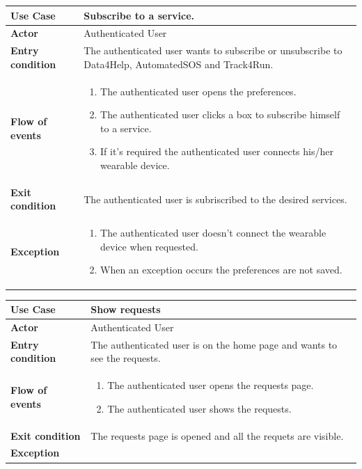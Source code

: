 \documentclass[../main.tex]{subfiles}
\begin{document}
	\vspace*{3cm}
	\begin{center}
		\begin{tabular}{p{3cm}p{8.28cm}}
			\hline
			\textbf{Use Case} & Subscribe to a service.\\
			\hline
			\textbf{Actor} & Authenticated User\\
			\hline
			\textbf{Entry condition} & The authenticated user wants to subscribe or unsubscribe to Data4Help, AutomatedSOS and Track4Run.\\
			\hline
			\textbf{Flow of events} & \begin{enumerate}
				\linespread{0}\item The authenticated user opens the preferences.
				\linespread{0}\item The authenticated user clicks a box to subscribe himself to a service.
				\linespread{0}\item If it's required the authenticated user connects his/her wearable device.
			\end{enumerate}\\
			\hline
			\textbf{Exit condition} & The authenticated user is subriscribed to the desired services.\\
			\hline
			\textbf{Exception} & \begin{enumerate}
				\linespread{0}\item The authenticated user doesn't connect the wearable device when requested.
				\linespread{0}\item When an exception occurs the preferences are not saved.
			\end{enumerate}\\
			\hline
		\end{tabular}
	\end{center}
	\vspace*{3cm}
	\begin{center}
		\begin{tabular}{p{3cm}p{8.28cm}}
			\hline
			\textbf{Use Case} & Show requests\\
			\hline
			\textbf{Actor} & Authenticated User\\
			\hline
			\textbf{Entry condition} & The authenticated user is on the home page and wants to see the requests.\\
			\hline
			\textbf{Flow of events} & \begin{enumerate}
				\linespread{0}\item The authenticated user opens the requests page.
				\linespread{0}\item The authenticated user shows the requests.
			\end{enumerate}\\
			\hline
			\textbf{Exit condition} & The requests page is opened and all the requets are visible.\\
			\hline
			\textbf{Exception}\\
			\hline
		\end{tabular}
	\end{center}
\end{document}
